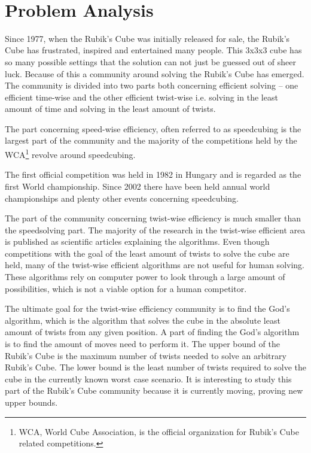 \documentclass{article}
\begin{document}
\ \pagebreak{}

\section{Problem Analysis}
Since 1977, when the Rubik's Cube was initially released for sale, the Rubik's Cube has frustrated, inspired and entertained many people. This 3x3x3 cube has so many possible settings that the solution can not just be guessed out of sheer luck. Because of this a community around solving the Rubik's Cube has emerged. The community is divided into two parts both concerning efficient solving -- one efficient time-wise and the other efficient twist-wise i.e. solving in the least amount of time and solving in the least amount of twists. 

The part concerning speed-wise efficiency, often referred to as speedcubing is the largest part of the community and the majority of the competitions held by the WCA\footnote{WCA, World Cube Association, is the official organization for Rubik's Cube related competitions.} revolve around speedcubing.

The first official competition was held in 1982 in Hungary and is regarded as the first World championship. Since 2002 there have been held annual world championships and plenty other events concerning speedcubing. 

The part of the community concerning twist-wise efficiency is much smaller than the speedsolving part. The majority of the research in the twist-wise efficient area is published as scientific articles explaining the algorithms. Even though competitions with the goal of the least amount of twists to solve the cube are held, many of the twist-wise efficient algorithms are not useful for human solving. These algorithms rely on computer power to look through a large amount of possibilities, which is not a viable option for a human competitor.

The ultimate goal for the twist-wise efficiency community is to find the God's algorithm, which is the algorithm that solves the cube in the absolute least amount of twists from any given position. A part of finding the God's algorithm is to find the amount of moves need to perform it. 
The upper bound of the Rubik's Cube is the maximum number of twists needed to solve an arbitrary Rubik's Cube.
The lower bound is the least number of twists required to solve the cube in the currently known worst case scenario. It is interesting to study this part of the Rubik's Cube community because it is currently moving, proving new upper bounds.
\end{document}
